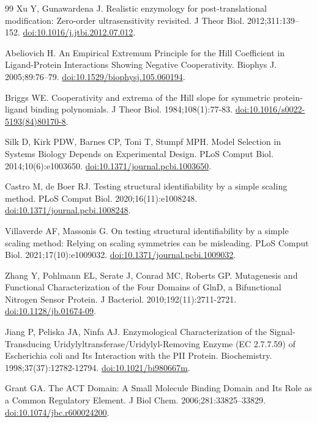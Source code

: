\documentclass[10pt,letterpaper]{article}
\begin{document}
\begin{singlespace}
\begin{thebibliography}{99}
Xu Y, Gunawardena J. Realistic enzymology for post-translational modification: Zero-order ultrasensitivity revisited. J Theor Biol. 2012;311:139--152. \href{https://doi.org/10.1016/j.jtbi.2012.07.012}{doi:10.1016/j.jtbi.2012.07.012}.

Abeliovich H. An Empirical Extremum Principle for the Hill Coefficient in Ligand-Protein Interactions Showing Negative Cooperativity. Biophys J. 2005;89:76--79. \href{https://doi.org/10.1529/biophysj.105.060194}{doi:10.1529/biophysj.105.060194}.

Briggs WE. Cooperativity and extrema of the Hill slope for symmetric protein-ligand binding polynomials. J Theor Biol. 1984;108(1):77-83. \href{https://doi.org/10.1016/s0022-5193(84)80170-8}{doi:10.1016/s0022-5193(84)80170-8}.

Silk D, Kirk PDW, Barnes CP, Toni T, Stumpf MPH. Model Selection in Systems Biology Depends on Experimental Design. PLoS Comput Biol. 2014;10(6):e1003650. \href{https://doi.org/10.1371/journal.pcbi.1003650}{doi:10.1371/journal.pcbi.1003650}.

Castro M, de Boer RJ. Testing structural identifiability by a simple scaling method. PLoS Comput Biol. 2020;16(11):e1008248. \href{https://doi.org/10.1371/journal.pcbi.1008248}{doi:10.1371/journal.pcbi.1008248}.

Villaverde AF, Massonis G. On testing structural identifiability by a simple scaling method: Relying on scaling symmetries can be misleading. PLoS Comput Biol. 2021;17(10):e1009032. \href{https://doi.org/10.1371/journal.pcbi.1009032}{doi:10.1371/journal.pcbi.1009032}.

Zhang Y, Pohlmann EL, Serate J, Conrad MC, Roberts GP. Mutagenesis and Functional Characterization of the Four Domains of GlnD, a Bifunctional Nitrogen Sensor Protein. J Bacteriol. 2010;192(11):2711-2721. \href{https://doi.org/10.1128/jb.01674-09}{doi:10.1128/jb.01674-09}.

Jiang P, Peliska JA, Ninfa AJ. Enzymological Characterization of the Signal-Transducing Uridylyltransferase/Uridylyl-Removing Enzyme (EC 2.7.7.59) of Escherichia coli and Its Interaction with the PII Protein. Biochemistry. 1998;37(37):12782-12794. \href{https://doi.org/10.1021/bi980667m}{doi:10.1021/bi980667m}.

Grant GA. The ACT Domain: A Small Molecule Binding Domain and Its Role as a Common Regulatory Element. J Biol Chem. 2006;281:33825--33829. \href{https://doi.org/10.1074/jbc.r600024200}{doi:10.1074/jbc.r600024200}.


\end{thebibliography}
\end{singlespace}
\end{document}
